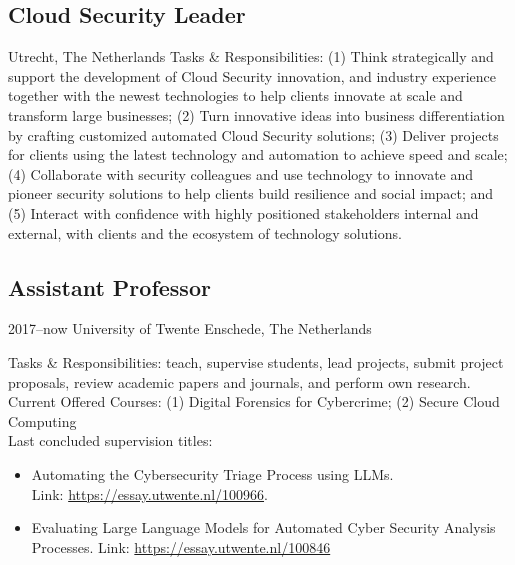 \documentclass[print]{styles/friggeri-cv-mac} %
\begin{document}
\subsection{Cloud Security Leader}\vspace{-5pt}
\begin{entrylist}
{Utrecht, The Netherlands}
{Tasks \& Responsibilities: (1) Think strategically and support the development of Cloud Security innovation, and industry experience together with the newest technologies to help clients innovate at scale and transform large businesses; (2) Turn innovative ideas into business differentiation by crafting customized automated Cloud Security solutions; (3) Deliver projects for clients using the latest technology and automation to achieve speed and scale; (4) Collaborate with security colleagues and use technology to innovate and pioneer security solutions to help clients build resilience and social impact; and (5) Interact with confidence with highly positioned stakeholders internal and external, with clients and the ecosystem of technology solutions.}
\end{entrylist}

\subsection{Assistant Professor}\vspace{-5pt}
\begin{entrylist}
	\entry
	{2017--now}
	{University of Twente}
	{Enschede, The Netherlands}
	{Tasks \& Responsibilities: teach, supervise students, lead projects, submit project proposals, review academic papers and journals, and perform own research.\\
	Current Offered Courses: (1) Digital Forensics for Cybercrime; (2) Secure Cloud Computing\\
	Last concluded supervision titles: 
	\begin{itemize}
		\item Automating the Cybersecurity Triage Process using LLMs.\\
		Link: \href{https://essay.utwente.nl/100966}{https://essay.utwente.nl/100966}.
		\item Evaluating Large Language Models for Automated Cyber Security Analysis Processes.
		Link: \href{https://essay.utwente.nl/100846}{https://essay.utwente.nl/100846}
	\end{itemize}
	} 
	
\end{entrylist}
\end{document}
